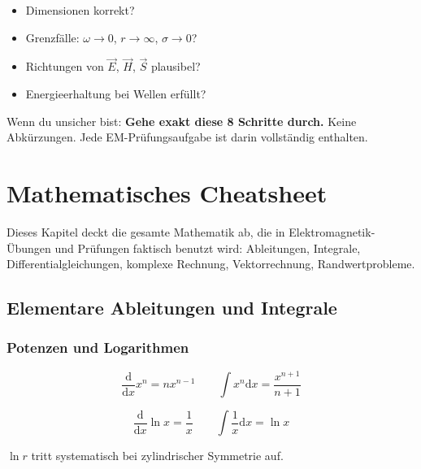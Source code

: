 \documentclass[a4paper]{article}
\newcommand{\imp}[1]{{\color{accent}\bfseries #1}}
\renewcommand{\dd}{\mathrm{d}}
\newcommand{\E}{\vec E}
\newcommand{\Hf}{\vec H}
\begin{document}
\begin{checkitem}
\begin{itemize}
  \item Dimensionen korrekt?
  \item Grenzfälle: $\omega\to0$, $r\to\infty$, $\sigma\to0$?
  \item Richtungen von $\E$, $\Hf$, $\vec S$ plausibel?
  \item Energieerhaltung bei Wellen erfüllt?
\end{itemize}
\end{checkitem}

\begin{taktik}
Wenn du unsicher bist:  
\imp{Gehe exakt diese 8 Schritte durch.}  
Keine Abkürzungen. Jede EM-Prüfungsaufgabe ist darin vollständig enthalten.
\end{taktik}
\section{Mathematisches Cheatsheet}

\begin{merke}
Dieses Kapitel deckt die gesamte Mathematik ab,
die in Elektromagnetik-Übungen und Prüfungen faktisch benutzt wird:
Ableitungen, Integrale, Differentialgleichungen, komplexe Rechnung,
Vektorrechnung, Randwertprobleme.
\end{merke}

\subsection{Elementare Ableitungen und Integrale}

\subsubsection{Potenzen und Logarithmen}

\[
\frac{\dd}{\dd x} x^n = n x^{n-1}
\qquad
\int x^n \dd x = \frac{x^{n+1}}{n+1}
\]

\[
\frac{\dd}{\dd x}\ln x = \frac{1}{x}
\qquad
\int \frac{1}{x}\dd x = \ln x
\]

\begin{checkitem}
$\ln r$ tritt systematisch bei zylindrischer Symmetrie auf.
\end{checkitem}
\end{document}
